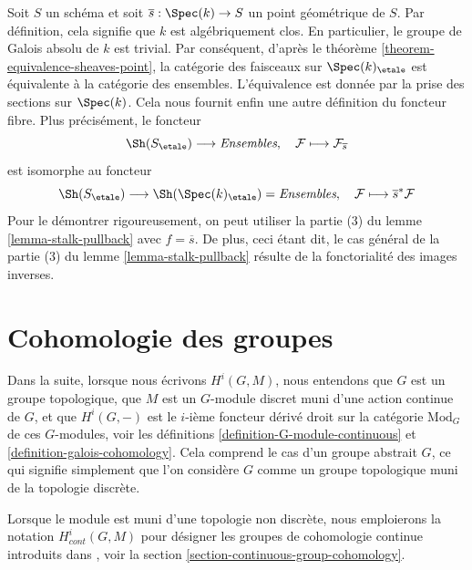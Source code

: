 \begin{remark}
\label{remark-stalk-pullback}
Soit $S$ un sch\'ema et soit $\overline{s} : \Spec(k) \to S$
un point g\'eom\'etrique de $S$. Par d\'efinition, cela signifie que $k$
est alg\'ebriquement clos. En particulier, le groupe de Galois absolu de $k$
est trivial. Par cons\'equent, d'apr\`es le
th\'eor\`eme \ref{theorem-equivalence-sheaves-point},
la cat\'egorie des faisceaux sur $\Spec(k)_\etale$ est \'equivalente
\`a la cat\'egorie des ensembles. L'\'equivalence est donn\'ee par la prise des
sections sur $\Spec(k)$. Cela nous fournit enfin une
autre d\'efinition du foncteur fibre. Plus pr\'ecis\'ement, le foncteur
$$
\Sh(S_\etale) \longrightarrow \textit{Ensembles}, \quad
\mathcal{F} \longmapsto \mathcal{F}_{\overline{s}}
$$
est isomorphe au foncteur
$$
\Sh(S_\etale)
\longrightarrow
\Sh(\Spec(k)_\etale) = \textit{Ensembles},
\quad
\mathcal{F} \longmapsto \overline{s}^*\mathcal{F}
$$
Pour le d\'emontrer rigoureusement, on peut utiliser
la partie (3) du lemme \ref{lemma-stalk-pullback}
avec $f = \overline{s}$. De plus, ceci \'etant dit, le cas g\'en\'eral de la
partie (3) du lemme \ref{lemma-stalk-pullback}
r\'esulte de la fonctorialit\'e des images inverses.
\end{remark}






\section{Cohomologie des groupes}
\label{section-group-cohomology}

\noindent
Dans la suite, lorsque nous \'ecrivons $H^i(G, M)$, nous entendons que $G$
est un groupe topologique, que $M$ est un $G$-module discret muni d'une
action continue de $G$, et que $H^i(G, -)$ est le $i$-i\`eme foncteur d\'eriv\'e
droit sur la cat\'egorie $\text{Mod}_G$ de ces $G$-modules, voir les
d\'efinitions \ref{definition-G-module-continuous} et
\ref{definition-galois-cohomology}. Cela comprend
le cas d'un groupe abstrait $G$, ce qui signifie simplement que l'on consid\`ere $G$
comme un groupe topologique muni de la topologie discr\`ete.

\medskip\noindent
Lorsque le module est muni d'une topologie non discr\`ete, nous emploierons la notation
$H^i_{cont}(G, M)$ pour d\'esigner les groupes de cohomologie continue
introduits dans \cite{Tate}, voir la
section \ref{section-continuous-group-cohomology}.


